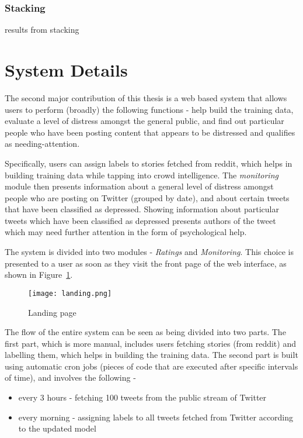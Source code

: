 \subsubsection{Stacking}
results from stacking

\section{System Details}

The second major contribution of this thesis is a web based system that allows users to perform (broadly) the following functions - help build the training data, evaluate a level of distress amongst the general public, and find out particular people who have been posting content that appears to be distressed and qualifies as needing-attention.

Specifically, users can assign labels to stories fetched from reddit, which helps in building training data while tapping into crowd intelligence. The \emph{monitoring} module then presents information about a general level of distress amongst people who are posting on Twitter (grouped by date), and about certain tweets that have been classified as depressed. Showing information about particular tweets which have been classified as depressed presents authors of the tweet which may need further attention in the form of psychological help.

The system is divided into two modules - \emph{Ratings} and \emph{Monitoring}. This choice is presented to a user as soon as they visit the front page of the web interface, as shown in Figure~\ref{landing}.
\begin{figure}
    \centering
    \texttt{[image: landing.png]}
    \caption{Landing page}
    \label{landing}
\end{figure}

The flow of the entire system can be seen as being divided into two parts. The first part, which is more manual, includes users fetching stories (from reddit) and labelling them, which helps in building the training data. The second part is built using automatic cron jobs (pieces of code that are executed after specific intervals of time), and involves the following -
\begin{itemize}
    \item{every 3 hours - fetching 100 tweets from the public stream of Twitter}
    \item{every morning - assigning labels to all tweets fetched from Twitter according to the updated model}
\end{itemize}

